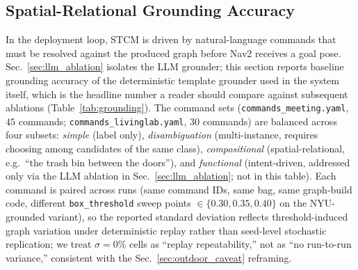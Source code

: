 \subsection{Spatial-Relational Grounding Accuracy}
\label{sec:grounding}

In the deployment loop, STCM is driven by natural-language commands
that must be resolved against the produced graph before Nav2 receives
a goal pose. Sec.~\ref{sec:llm_ablation} isolates the LLM grounder;
this section reports baseline grounding accuracy of the deterministic
template grounder used in the system itself, which is the headline
number a reader should compare against subsequent ablations
(Table~\ref{tab:grounding}). The command sets (\texttt{commands\_meeting.yaml},
$45$ commands; \texttt{commands\_livinglab.yaml}, $30$ commands) are
balanced across four subsets: \emph{simple} (label only),
\emph{disambiguation} (multi-instance, requires choosing among
candidates of the same class), \emph{compositional}
(spatial-relational, e.g.\ ``the trash bin between the doors''), and
\emph{functional} (intent-driven, addressed only via the LLM
ablation in Sec.~\ref{sec:llm_ablation}; not in this table). Each
command is paired across runs (same command IDs, same bag, same
graph-build code, different \texttt{box\_threshold} sweep points
$\in \{0.30, 0.35, 0.40\}$ on the NYU-grounded variant), so the
reported standard deviation reflects threshold-induced graph
variation under deterministic replay rather than seed-level
stochastic replication; we treat $\sigma{=}0\%$ cells as ``replay
repeatability,'' not as ``no run-to-run variance,'' consistent
with the Sec.~\ref{sec:outdoor_caveat} reframing.

